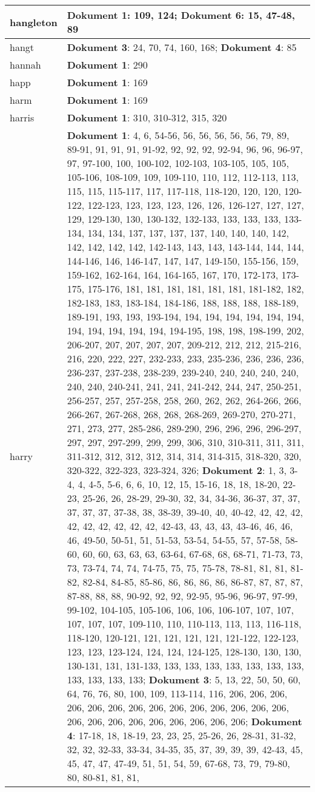 \documentclass[a5paper]{article}
\begin{document}
\begin{longtable}[l]{|l|p{3in}|}
\hline
hangleton & \textbf{Dokument 1}: 109, 124; \textbf{Dokument 6}: 15, 47-48, 89 \\
\hline
hangt & \textbf{Dokument 3}: 24, 70, 74, 160, 168; \textbf{Dokument 4}: 85 \\
\hline
hannah & \textbf{Dokument 1}: 290 \\
\hline
happ & \textbf{Dokument 1}: 169 \\
\hline
harm & \textbf{Dokument 1}: 169 \\
\hline
harris & \textbf{Dokument 1}: 310, 310-312, 315, 320 \\
\hline
harry & \textbf{Dokument 1}: 4, 6, 54-56, 56, 56, 56, 56, 56, 79, 89, 89-91, 91, 91, 91, 91-92, 92, 92, 92, 92-94, 96, 96, 96-97, 97, 97-100, 100, 100-102, 102-103, 103-105, 105, 105, 105-106, 108-109, 109, 109-110, 110, 112, 112-113, 113, 115, 115, 115-117, 117, 117-118, 118-120, 120, 120, 120-122, 122-123, 123, 123, 123, 126, 126, 126-127, 127, 127, 129, 129-130, 130, 130-132, 132-133, 133, 133, 133, 133-134, 134, 134, 137, 137, 137, 137, 140, 140, 140, 142, 142, 142, 142, 142, 142-143, 143, 143, 143-144, 144, 144, 144-146, 146, 146-147, 147, 147, 149-150, 155-156, 159, 159-162, 162-164, 164, 164-165, 167, 170, 172-173, 173-175, 175-176, 181, 181, 181, 181, 181, 181, 181-182, 182, 182-183, 183, 183-184, 184-186, 188, 188, 188, 188-189, 189-191, 193, 193, 193-194, 194, 194, 194, 194, 194, 194, 194, 194, 194, 194, 194, 194-195, 198, 198, 198-199, 202, 206-207, 207, 207, 207, 207, 209-212, 212, 212, 215-216, 216, 220, 222, 227, 232-233, 233, 235-236, 236, 236, 236, 236-237, 237-238, 238-239, 239-240, 240, 240, 240, 240, 240, 240, 240-241, 241, 241, 241-242, 244, 247, 250-251, 256-257, 257, 257-258, 258, 260, 262, 262, 264-266, 266, 266-267, 267-268, 268, 268, 268-269, 269-270, 270-271, 271, 273, 277, 285-286, 289-290, 296, 296, 296, 296-297, 297, 297, 297-299, 299, 299, 306, 310, 310-311, 311, 311, 311-312, 312, 312, 312, 314, 314, 314-315, 318-320, 320, 320-322, 322-323, 323-324, 326; \textbf{Dokument 2}: 1, 3, 3-4, 4, 4-5, 5-6, 6, 6, 10, 12, 15, 15-16, 18, 18, 18-20, 22-23, 25-26, 26, 28-29, 29-30, 32, 34, 34-36, 36-37, 37, 37, 37, 37, 37, 37-38, 38, 38-39, 39-40, 40, 40-42, 42, 42, 42, 42, 42, 42, 42, 42, 42, 42-43, 43, 43, 43, 43-46, 46, 46, 46, 49-50, 50-51, 51, 51-53, 53-54, 54-55, 57, 57-58, 58-60, 60, 60, 63, 63, 63, 63-64, 67-68, 68, 68-71, 71-73, 73, 73, 73-74, 74, 74, 74-75, 75, 75, 75-78, 78-81, 81, 81, 81-82, 82-84, 84-85, 85-86, 86, 86, 86, 86, 86-87, 87, 87, 87, 87-88, 88, 88, 90-92, 92, 92, 92-95, 95-96, 96-97, 97-99, 99-102, 104-105, 105-106, 106, 106, 106-107, 107, 107, 107, 107, 107, 109-110, 110, 110-113, 113, 113, 116-118, 118-120, 120-121, 121, 121, 121, 121, 121-122, 122-123, 123, 123, 123-124, 124, 124, 124-125, 128-130, 130, 130, 130-131, 131, 131-133, 133, 133, 133, 133, 133, 133, 133, 133, 133, 133, 133; \textbf{Dokument 3}: 5, 13, 22, 50, 50, 60, 64, 76, 76, 80, 100, 109, 113-114, 116, 206, 206, 206, 206, 206, 206, 206, 206, 206, 206, 206, 206, 206, 206, 206, 206, 206, 206, 206, 206, 206, 206, 206; \textbf{Dokument 4}: 17-18, 18, 18-19, 23, 23, 25, 25-26, 26, 28-31, 31-32, 32, 32, 32-33, 33-34, 34-35, 35, 37, 39, 39, 39, 42-43, 45, 45, 47, 47, 47-49, 51, 51, 54, 59, 67-68, 73, 79, 79-80, 80, 80-81, 81, 81, 
\end{longtable}
\end{document}
